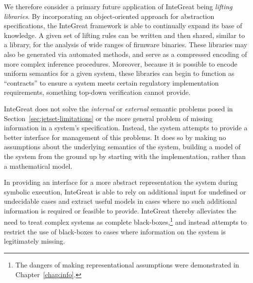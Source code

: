 We therefore consider a primary future application of InteGreat being \emph{lifting libraries}.
By incorporating an object-oriented approach for abstraction specifications, the InteGreat framework is able to continually expand its base of knowledge.
A given set of lifting rules can be written and then shared, similar to a library, for the analysis of wide ranges of firmware binaries.
These libraries may also be generated via automated methods, and serve as a compressed encoding of more complex inference procedures.
Moreover, because it is possible to encode uniform semantics for a given system, these libraries can begin to function as ``contracts'' to ensure a system meets certain regulatory implementation requirements, something top-down verification cannot provide.

InteGreat does not solve the \emph{internal} or \emph{external} semantic problems posed in Section~\ref{sec:jetset-limitations} or the more general problem of missing information in a system's specification.
Instead, the system attempts to provide a better interface for management of this problems.
It does so by making no assumptions about the underlying semantics of the system, building a model of the system from the ground up by starting with the implementation, rather than a mathematical model.

In providing an interface for a more abstract representation the system during symbolic execution, InteGreat is able to rely on additional input for undefined or undecidable cases and extract useful models in cases where no such additional information is required or feasible to provide.
InteGreat thereby alleviates the need to treat complex systems as complete black-boxes,\footnote{The dangers of making representational assumptions were demonstrated in Chapter~\ref{chap:info}.} and instead attempts to restrict the use of black-boxes to cases where information on the system is legitimately missing.
